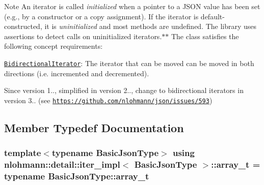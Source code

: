 \begin{DoxyNote}{Note}
An iterator is called {\itshape initialized} when a pointer to a J\+S\+ON value has been set (e.\+g., by a constructor or a copy assignment). If the iterator is default-\/constructed, it is {\itshape uninitialized} and most methods are undefined. The library uses assertions to detect calls on uninitialized iterators.$\ast$$\ast$  The class satisfies the following concept requirements\+:
\begin{DoxyItemize}
\item \href{https://en.cppreference.com/w/cpp/named_req/BidirectionalIterator}{\tt Bidirectional\+Iterator}\+: The iterator that can be moved can be moved in both directions (i.\+e. incremented and decremented). 
\end{DoxyItemize}
\end{DoxyNote}
\begin{DoxySince}{Since}
version 1.., simplified in version 2.., change to bidirectional iterators in version 3.. (see \href{https://github.com/nlohmann/json/issues/593}{\tt https\+://github.\+com/nlohmann/json/issues/593}) 
\end{DoxySince}


\subsection{Member Typedef Documentation}
\subsubsection[{\texorpdfstring{array\+\_\+t}{array_t}}]{\setlength{\rightskip}{0pt plus 5cm}template$<$typename Basic\+Json\+Type$>$ using {\bf nlohmann\+::detail\+::iter\+\_\+impl}$<$ {\bf Basic\+Json\+Type} $>$\+::{\bf array\+\_\+t} =  typename Basic\+Json\+Type\+::array\+\_\+t\hspace{0.3cm}{\ttfamily [private]}}\hypertarget{classnlohmann_1_1detail_1_1iter__impl_aef02cf75b1cb199286fd2f666c60e38e}{}\label{classnlohmann_1_1detail_1_1iter__impl_aef02cf75b1cb199286fd2f666c60e38e}
